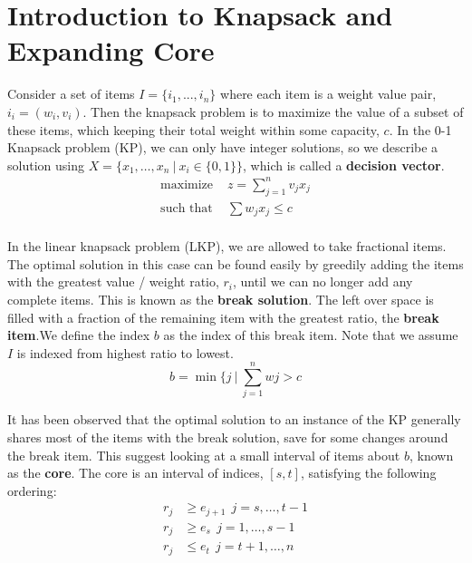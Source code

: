 \documentclass{article}
\begin{document}
\section{Introduction to Knapsack and Expanding Core}
Consider a set of items $I = \{i_1,...,i_n\}$ where each item is a weight value pair, $i_i = (w_i, v_i)$. Then the knapsack problem is to maximize the value of a subset of these items, which keeping their total weight within some capacity, $c$. In the 0-1 Knapsack problem (KP), we can only have integer solutions, so we describe a solution using $X = \{x_1,\ldots,x_n \ | \ x_i \in \{0,1\}\}$, which is called a {\bf decision vector}.
\begin{equation} \label{knapsackdef}
\begin{aligned}
    \text{maximize }& z = \sum\limits_{j=1}^n v_jx_j \\
    \text{such that }& \sum  w_j x_j \leq c\\
\end{aligned}
\end{equation}

In the linear knapsack problem (LKP), we are allowed to take fractional items. The optimal solution in this case can be found easily by greedily adding the items with the greatest value / weight ratio, $r_i$, until we can no longer add any complete items. This is known as the {\bf break solution}. The left over space is filled with a fraction of the remaining item with the greatest ratio, the {\bf break item}.We define the index $b$ as the index of this break item. Note that we assume $I$ is indexed from highest ratio to lowest. 
\begin{equation} \label{breakitemdef}
    b = \min \{j \ | \ \sum\limits_{j=1}^n wj > c
\end{equation}

It has been observed that the optimal solution to an instance of the KP generally shares most of the items with the break solution, save for some changes around the break item. This suggest looking at a small interval of items about $b$, known as the {\bf core}. The core is an interval of indices, $[s,t]$, satisfying the following ordering:
\begin{equation} \label{coreOrdering}
    \begin{aligned}
        r_j &\geq e_{j+1} \ \ j = s, \ldots , t-1\\
        r_j &\geq e_s \ \ j = 1, \ldots ,s-1\\
        r_j &\leq e_t \ \ j = t+1, \ldots , n
    \end{aligned}
\end{equation}
\end{document}
